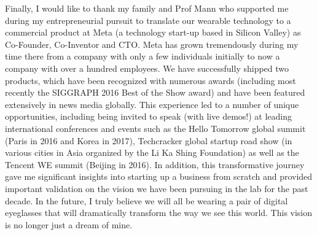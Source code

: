 Finally, I would like to thank my family and Prof Mann who supported me during my entrepreneurial pursuit to translate our wearable technology to a commercial product at Meta (a technology start-up based in Silicon Valley) as Co-Founder, Co-Inventor and CTO. Meta has grown tremendously during my time there from a company with only a few individuals initially to now a company with over a hundred employees. We have successfully shipped two products, which have been recognized with numerous awards (including most recently the SIGGRAPH 2016 Best of the Show award) and have been featured extensively in news media globally.  This experience led to a number of unique opportunities, including being invited to speak (with live demos!) at leading international conferences and events such as the Hello Tomorrow global summit (Paris in 2016 and Korea in 2017), Techcracker global startup road show (in various cities in Asia organized by the Li Ka Shing Foundation) as well as the Tencent WE summit (Beijing in 2016).  In addition, this transformative journey gave me significant insights into starting up a business from scratch and provided important validation on the vision we have been pursuing in the lab for the past decade. In the future, I truly believe we will all be wearing a pair of digital eyeglasses that will dramatically transform the way we see this world. This vision is no longer just a dream of mine. 
